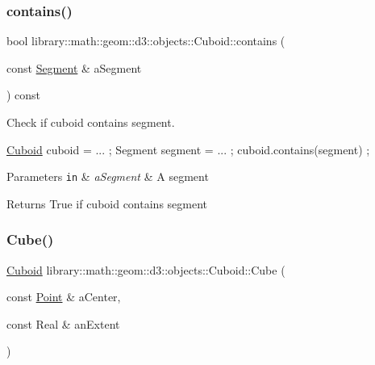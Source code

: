 \subsubsection{\texorpdfstring{contains()}{contains()}\hspace{0.1cm}{\footnotesize\ttfamily [3/3]}}
{\footnotesize\ttfamily bool library\+::math\+::geom\+::d3\+::objects\+::\+Cuboid\+::contains (\begin{DoxyParamCaption}\item[{const \hyperlink{classlibrary_1_1math_1_1geom_1_1d3_1_1objects_1_1_segment}{Segment} \&}]{a\+Segment }\end{DoxyParamCaption}) const}



Check if cuboid contains segment. 


\begin{DoxyCode}
\hyperlink{classlibrary_1_1math_1_1geom_1_1d3_1_1objects_1_1_cuboid_ac42299f962fab284a76a46d4ea4e6fa2}{Cuboid} cuboid = ... ;
Segment segment = ... ;
cuboid.contains(segment) ;
\end{DoxyCode}



\begin{DoxyParams}[1]{Parameters}
\mbox{\tt in}  & {\em a\+Segment} & A segment \\
\hline
\end{DoxyParams}
\begin{DoxyReturn}{Returns}
True if cuboid contains segment 
\end{DoxyReturn}
\mbox{\label{classlibrary_1_1math_1_1geom_1_1d3_1_1objects_1_1_cuboid_ac13abaa04f53ab22888ea6c0f697fbc8}} 
\subsubsection{\texorpdfstring{Cube()}{Cube()}}
{\footnotesize\ttfamily \hyperlink{classlibrary_1_1math_1_1geom_1_1d3_1_1objects_1_1_cuboid}{Cuboid} library\+::math\+::geom\+::d3\+::objects\+::\+Cuboid\+::\+Cube (\begin{DoxyParamCaption}\item[{const \hyperlink{classlibrary_1_1math_1_1geom_1_1d3_1_1objects_1_1_point}{Point} \&}]{a\+Center,  }\item[{const Real \&}]{an\+Extent }\end{DoxyParamCaption})\hspace{0.3cm}{\ttfamily [static]}}



